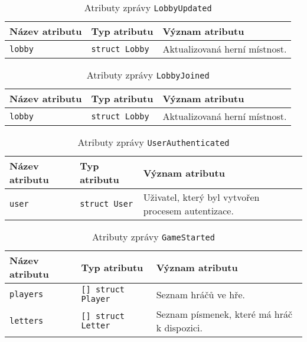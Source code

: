 \documentclass[12pt, a4paper]{article}
\begin{document}
\begin{center}
		\begin{table}[!ht]
		     \caption{Atributy zprávy \texttt{LobbyUpdated}}
		\begin{tabularx}{\textwidth}{|l|l|X|}
			\hline
			\textbf{Název atributu} & \textbf{Typ atributu} & \textbf{Význam atributu} \\ 
			\hline
			\texttt{lobby}          &\texttt{struct Lobby}&Aktualizovaná herní místnost.\\
			\hline
		\end{tabularx}
		\end{table}
\end{center}  



\begin{center}
		\begin{table}[!ht]
		     \caption{Atributy zprávy \texttt{LobbyJoined}}
		\begin{tabularx}{\textwidth}{|l|l|X|}
			\hline
			\textbf{Název atributu} & \textbf{Typ atributu} & \textbf{Význam atributu} \\ 
			\hline
			\texttt{lobby}          &\texttt{struct Lobby}&Aktualizovaná herní místnost.\\
			\hline
		\end{tabularx}
		\end{table}
\end{center}  

\begin{center}
		\begin{table}[!ht]
		     \caption{Atributy zprávy \texttt{UserAuthenticated}}
		\begin{tabularx}{\textwidth}{|l|l|X|}
			\hline
			\textbf{Název atributu} & \textbf{Typ atributu} & \textbf{Význam atributu} \\ 
			\hline
			\texttt{user}          &\texttt{struct User}&Uživatel, který byl vytvořen procesem autentizace.\\
			\hline
		\end{tabularx}
		\end{table}
\end{center}  	

\begin{center}
		\begin{table}[!ht]
		     \caption{Atributy zprávy \texttt{GameStarted}}
		\begin{tabularx}{\textwidth}{|l|l|X|}
			\hline
			\textbf{Název atributu} & \textbf{Typ atributu} & \textbf{Význam atributu} \\ 
			\hline
			\texttt{players}          &\texttt{[] struct Player}&Seznam hráčů ve hře.\\
			\hline
			\texttt{letters}          &\texttt{[] struct Letter}&Seznam písmenek, které má hráč k dispozici.\\
			\hline
		\end{tabularx}
		\end{table}
\end{center}  	
\end{document}
